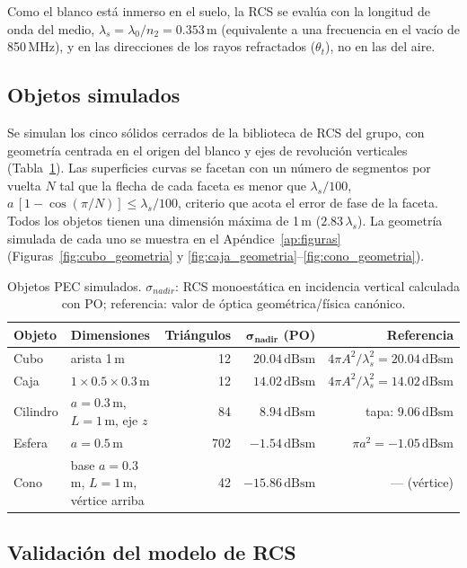 \documentclass[11pt,a4paper]{report}
\newcommand{\dBsm}{\,\mathrm{dBsm}}
\begin{document}
Como el blanco está inmerso en el suelo, la RCS se evalúa con la longitud de
onda del medio, $\lambda_s=\lambda_0/n_2=0.353\,\mathrm{m}$ (equivalente a
una frecuencia en el vacío de 850\,MHz), y en las direcciones de los rayos
refractados ($\theta_t$), no en las del aire.

\subsection{Objetos simulados}

Se simulan los cinco sólidos cerrados de la biblioteca de RCS del grupo,
con geometría centrada en el origen del blanco y ejes de revolución
verticales (Tabla~\ref{tab:objetos}). Las superficies curvas se facetan con
un número de segmentos por vuelta $N$ tal que la flecha de cada faceta es
menor que $\lambda_s/100$, $a\,[1-\cos(\pi/N)]\le\lambda_s/100$, criterio
que acota el error de fase de la faceta. Todos los objetos tienen una
dimensión máxima de 1\,m ($2.83\,\lambda_s$). La geometría simulada de cada
uno se muestra en el Apéndice~\ref{ap:figuras}
(Figuras~\ref{fig:cubo_geometria} y \ref{fig:caja_geometria}--\ref{fig:cono_geometria}).

\begin{table}[H]
\centering
\caption{Objetos PEC simulados. $\sigma_{nadir}$: RCS monoestática en
incidencia vertical calculada con PO; referencia: valor de óptica
geométrica/física canónico.}
\label{tab:objetos}
\small
\setlength{\tabcolsep}{4pt}
\begin{tabular}{@{}llrrr@{}}
\toprule
\textbf{Objeto} & \textbf{Dimensiones} & \textbf{Triángulos} & $\bm{\sigma_{nadir}}$ \textbf{(PO)} & \textbf{Referencia} \\
\midrule
Cubo & arista 1\,m & 12 & $20.04\dBsm$ & $4\pi A^2/\lambda_s^2 = 20.04\dBsm$ \\
Caja & $1\times0.5\times0.3$\,m & 12 & $14.02\dBsm$ & $4\pi A^2/\lambda_s^2 = 14.02\dBsm$ \\
Cilindro & $a=0.3$\,m, $L=1$\,m, eje $z$ & 84 & $8.94\dBsm$ & tapa: $9.06\dBsm$ \\
Esfera & $a=0.5$\,m & 702 & $-1.54\dBsm$ & $\pi a^2 = -1.05\dBsm$ \\
Cono & base $a=0.3$\,m, $L=1$\,m, vértice arriba & 42 & $-15.86\dBsm$ & --- (vértice) \\
\bottomrule
\end{tabular}
\end{table}

\subsection{Validación del modelo de RCS}
\label{sec:validacion_met}
\end{document}
